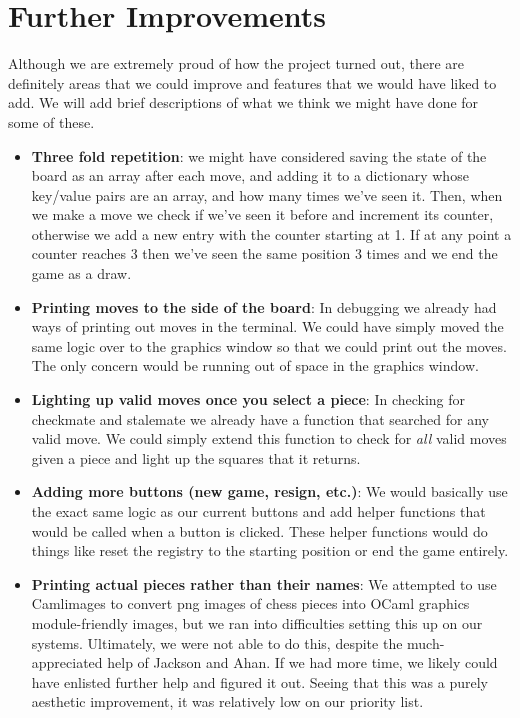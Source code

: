 \documentclass{article}
\begin{document}
\section{Further Improvements}
Although we are extremely proud of how the project turned out, there are definitely areas that we could improve and features that we would have liked to add. We will add brief descriptions of what we think we might have done for some of these.
\begin{itemize}
    \item \textbf{Three fold repetition}: we might have considered saving the state of the board as an array after each move, and adding it to a dictionary whose key/value pairs are an array, and how many times we've seen it. Then, when we make a move we check if we've seen it before and increment its counter, otherwise we add a new entry with the counter starting at 1. If at any point a counter reaches 3 then we've seen the same position 3 times and we end the game as a draw. 
    
    \item \textbf{Printing moves to the side of the board}: In debugging we already had ways of printing out moves in the terminal. We could have simply moved the same logic over to the graphics window so that we could print out the moves. The only concern would be running out of space in the graphics window.

    \item \textbf{Lighting up valid moves once you select a piece}: In checking for checkmate and stalemate we already have a function that searched for any valid move. We could simply extend this function to check for \textit{all} valid moves given a piece and light up the squares that it returns. 
    
    \item \textbf{Adding more buttons (new game, resign, etc.)}: We would basically use the exact same logic as our current buttons and add helper functions that would be called when a button is clicked. These helper functions would do things like reset the registry to the starting position or end the game entirely. 

    \item \textbf{Printing actual pieces rather than their names}: We attempted to use Camlimages to convert png images of chess pieces into OCaml graphics module-friendly images, but we ran into difficulties setting this up on our systems. Ultimately, we were not able to do this, despite the much-appreciated help of Jackson and Ahan. If we had more time, we likely could have enlisted further help and figured it out. Seeing that this was a purely aesthetic improvement, it was relatively low on our priority list.
    

\end{itemize}
\end{document}
